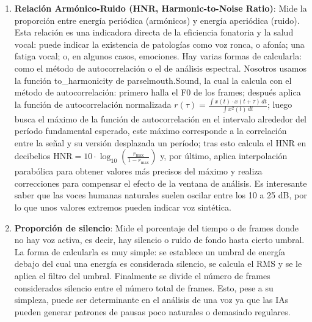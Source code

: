 \begin{enumerate}
	\item \textbf{Relación Armónico-Ruido (HNR, Harmonic-to-Noise Ratio)}: Mide la proporción entre energía periódica (armónicos) y energía aperiódica (ruido). Esta relación es una indicadora directa de la eficiencia fonatoria y la salud vocal: puede indicar la existencia de patologías como voz ronca, o afonía; una fatiga vocal; o, en algunos casos, emociones. Hay varias formas de calcularla: como el método de autocorrelación o el de análisis espectral. Nosotros usamos la función to\_harmonicity de parselmouth.Sound, la cual la calcula con el método de autocorrelación: primero halla el F0 de los frames; después aplica la función de autocorrelación normalizada $r(\tau) = \frac{\int x(t) \cdot x(t+\tau) \, dt}{\int x^2(t) \, dt}$; luego busca el máximo de la función de autocorrelación en el intervalo alrededor del período fundamental esperado, este máximo corresponde a la correlación entre la señal y su versión desplazada un período; tras esto calcula el HNR en decibelios $\text{HNR} = 10 \cdot \log_{10}\left( \frac{r_{\text{max}}}{1 - r_{\text{max}}} \right)$ y, por último, aplica interpolación parabólica para obtener valores más precisos del máximo y realiza correcciones para compensar el efecto de la ventana de análisis. Es interesante saber que las voces humanas naturales suelen oscilar entre los 10 a 25 dB, por lo que unos valores extremos pueden indicar voz sintética.
	\item \textbf{Proporción de silencio}: Mide el porcentaje del tiempo o de frames donde no hay voz activa, es decir, hay silencio o ruido de fondo hasta cierto umbral. La forma de calcularla es muy simple: se establece un umbral de energía debajo del cual una energía es considerada silencio, se calcula el RMS y se le aplica el filtro del umbral. Finalmente se divide el número de frames considerados silencio entre el número total de frames. Esto, pese a su simpleza, puede ser determinante en el análisis de una voz ya que las IAs pueden generar patrones de pausas poco naturales o demasiado regulares.

\end{enumerate}
